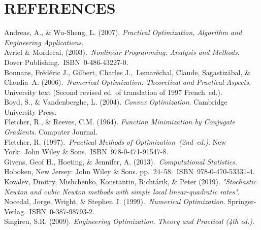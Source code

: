\documentclass[a4paper 12pt]{report}
\newcommand{\sps}{\\[0.2cm]}
\newcommand{\NI}{\noindent}
\begin{document}
	\chapter*{REFERENCES}

		\NI Andreas, A., \& Wu-Sheng, L. (2007). \textit{Practical Optimization, Algorithm and Engineering Applications.}\sps
		
		\NI Avriel \& Mordecai, (2003). \textit{Nonlinear Programming: Analysis and Methods}. Dover Publishing. ISBN 0-486-43227-0.\sps
		
		\NI Bonnans, Frédéric J., Gilbert, Charles J., Lemaréchal, Claude, Sagastizábal, \& Claudia A. (2006). \textit{Numerical Optimization: Theoretical and Practical Aspects.} University text (Second revised ed. of translation of 1997 French ed.).\sps
		
		\NI Boyd, S., \& Vandenberghe, L. (2004). \textit{Convex Optimization}. Cambridge University Press.\sps
		
		\NI Fletcher, R., \& Reeves, C.M. (1964). \textit{Function Minimization by Conjugate Gradients}. Computer Journal.\sps
		
		\NI Fletcher, R. (1997). \textit{Practical Methods of Optimization (2nd ed.)}. New York: John Wiley \& Sons. ISBN 978-0-471-91547-8.\sps
		
		\NI Givens, Geof H., Hoeting, \& Jennifer, A. (2013). \textit{Computational Statistics}. Hoboken, New Jersey: John Wiley \& Sons. pp. 24–58. ISBN 978-0-470-53331-4.\sps
		
		\NI Kovalev, Dmitry, Mishchenko, Konstantin, Richtárik, \& Peter (2019). \textit{"Stochastic Newton and cubic Newton methods with simple local linear-quadratic rates"}.\sps
		
		\NI Nocedal, Jorge, Wright, \& Stephen J. (1999). \textit{Numerical Optimization}. Springer-Verlag. ISBN 0-387-98793-2.\sps
		
		\NI Singireu, S.R. (2009). \textit{Engineering Optimization. Theory and Practical (4th ed.)}.\sps
\end{document}
